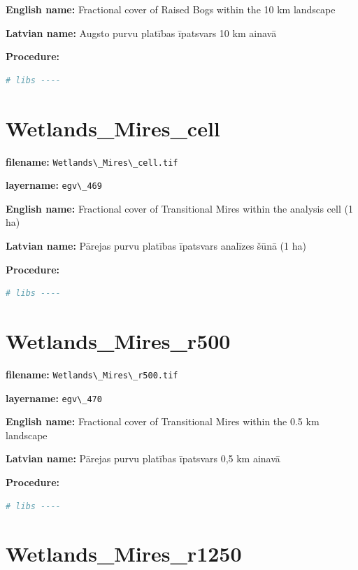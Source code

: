 \documentclass[
]{book}
\newcommand{\passthrough}[1]{#1}
\begin{document}
\textbf{English name:} Fractional cover of Raised Bogs within the 10 km landscape

\textbf{Latvian name:} Augsto purvu platības īpatsvars 10 km ainavā

\textbf{Procedure:}

\begin{lstlisting}[language=R]
# libs ----
\end{lstlisting}

\section{Wetlands\_Mires\_cell}\label{ch06.469}

\textbf{filename:} \passthrough{\lstinline!Wetlands\_Mires\_cell.tif!}

\textbf{layername:} \passthrough{\lstinline!egv\_469!}

\textbf{English name:} Fractional cover of Transitional Mires within the analysis cell (1 ha)

\textbf{Latvian name:} Pārejas purvu platības īpatsvars analīzes šūnā (1 ha)

\textbf{Procedure:}

\begin{lstlisting}[language=R]
# libs ----
\end{lstlisting}

\section{Wetlands\_Mires\_r500}\label{ch06.470}

\textbf{filename:} \passthrough{\lstinline!Wetlands\_Mires\_r500.tif!}

\textbf{layername:} \passthrough{\lstinline!egv\_470!}

\textbf{English name:} Fractional cover of Transitional Mires within the 0.5 km landscape

\textbf{Latvian name:} Pārejas purvu platības īpatsvars 0,5 km ainavā

\textbf{Procedure:}

\begin{lstlisting}[language=R]
# libs ----
\end{lstlisting}

\section{Wetlands\_Mires\_r1250}\label{ch06.471}
\end{document}
